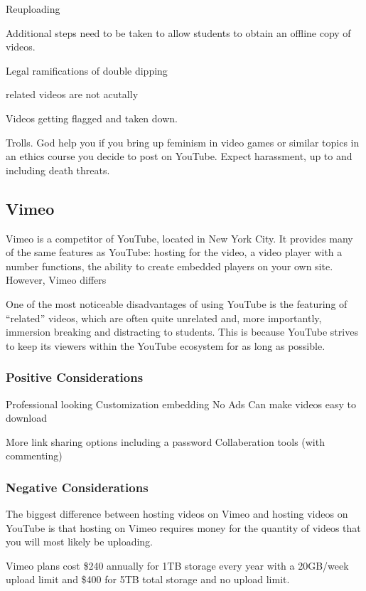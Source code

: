 \documentclass[sigconf]{acmart}
\begin{document}
Reuploading

Additional steps need to be taken to allow students to obtain an offline copy of videos.

Legal ramifications of double dipping

related videos are not acutally 


Videos getting flagged and taken down.

Trolls.  God help you if you bring up feminism in video games or similar topics in an ethics course you decide to post on YouTube.  Expect harassment, up to and including death threats. %

\subsection{Vimeo}
Vimeo is a competitor of YouTube, located in New York City.
It provides many of the same features as YouTube: hosting for the video, a video player with a number functions, the ability to create embedded players on your own site.
However, Vimeo differs 


One of the most noticeable disadvantages of using YouTube is the featuring of ``related'' videos, which are often quite unrelated and, more importantly, immersion breaking and distracting to students.
This is because YouTube strives to keep its viewers within the YouTube ecosystem for as long as possible.



\subsubsection{Positive Considerations}
Professional looking
Customization embedding
No Ads
Can make videos easy to download

More link sharing options including a password 
Collaberation tools (with commenting)

\subsubsection{Negative Considerations}
The biggest difference between hosting videos on Vimeo and hosting videos on YouTube is that hosting on Vimeo requires money for the quantity of videos that you will most likely be uploading.

Vimeo plans cost \$240 annually for 1TB storage every year with a 20GB/week upload limit and \$400 for 5TB total storage and no upload limit.
\end{document}
